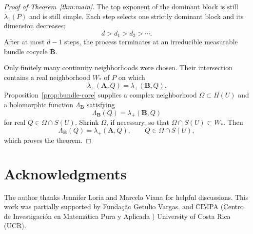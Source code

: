 \documentclass[11pt,a4paper]{amsart}
\begin{document}
\begin{proof}[Proof of Theorem~\ref{thm:main}]
The top exponent of the dominant block is still \(\lambda_1(P)\) and
is still simple. %
Each step selects one strictly dominant block and its
dimension decreases:
\[
 d>d_1>d_2>\cdots.
\]
After at most \(d-1\) steps, the process terminates at an irreducible
measurable bundle cocycle \(\mathbf B\).

Only finitely many continuity neighborhoods were chosen.  Their
intersection contains a real neighborhood \(W_*\) of \(P\) on which
\[
 \lambda_+(\mathbf A,Q)=\lambda_+(\mathbf B,Q).
\]
Proposition~\ref{prop:bundle-core} supplies a complex neighborhood
\(\Omega\subset H(U)\) and a holomorphic function
\(\Lambda_{\mathbf B}\) satisfying
\[
 \Lambda_{\mathbf B}(Q)=\lambda_+(\mathbf B,Q)
\]
for real \(Q\in\Omega\cap S(U)\).  Shrink \(\Omega\), if necessary,
so that \(\Omega\cap S(U)\subset W_*\).  Then
\[
 \Lambda_{\mathbf B}(Q)=\lambda_+(\mathbf A,Q),
 \qquad Q\in\Omega\cap S(U),
\]
which proves the theorem.
\end{proof}

\section*{Acknowledgments}
The author thanks Jennifer Loria and Marcelo Viana for helpful discussions.
This work was partially supported by Fundação Getulio Vargas, and CIMPA (Centro de Investigación en Matemática Pura y Aplicada ) University of Costa Rica (UCR).
\end{document}
